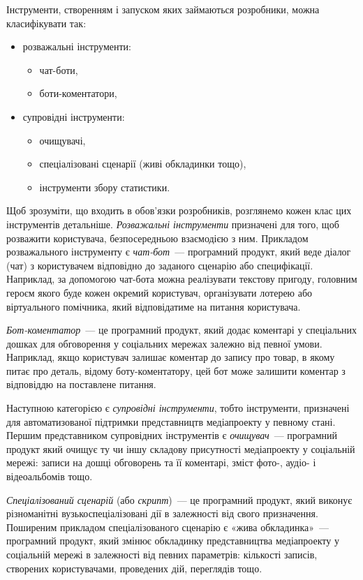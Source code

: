 \documentclass[
	a4paper,
	oneside,
	BCOR = 10mm,
	DIV = 12,
	12pt,
	headings = normal,
]{scrartcl}
\begin{document}
		Інструменти, створенням і запуском яких займаються розробники, можна класифікувати так:
		\begin{itemize}
			\item розважальні інструменти:
				\begin{itemize}
					\item чат-боти,
					\item боти-коментатори,
				\end{itemize}
			\item супровідні інструменти:
				\begin{itemize}
					\item очищувачі,
					\item спеціалізовані сценарії (живі обкладинки тощо),
					\item інструменти збору статистики.
				\end{itemize}
		\end{itemize}
		Щоб зрозуміти, що входить в обов'язки розробників, розглянемо кожен клас цих інструментів детальніше. \emph{Розважальні інструменти} призначені для того, щоб розважити користувача, безпосередньою взаємодією з ним. Прикладом розважального інструменту є \emph{чат-бот}~— програмний продукт, який веде діалог (чат) з користувачем відповідно до заданого сценарію або специфікації. Наприклад, за допомогою чат-бота можна реалізувати текстову пригоду, головним героєм якого буде кожен окремий користувач, організувати лотерею або віртуального помічника, який відповідатиме на питання користувача.

		\emph{Бот-коментатор}~— це програмний продукт, який додає коментарі у спеціальних дошках для обговорення у соціальних мережах залежно від певної умови. Наприклад, якщо користувач залишає коментар до запису про товар, в якому питає про деталь, відому боту-коментатору, цей бот може залишити коментар з відповіддю на поставлене питання. 

		Наступною категорією є \emph{супровідні інструменти}, тобто інструменти, призначені для автоматизованої підтримки представництв медіапроекту у певному стані. Першим представником супровідних інструментів є \emph{очищувач}~— програмний продукт який очищує ту чи іншу складову присутності медіапроекту у соціальній мережі: записи на дошці обговорень та її коментарі, зміст фото-, аудіо- і відеоальбомів тощо.

		\emph{Спеціалізований сценарій} (або \emph{скрипт})~— це програмний продукт, який виконує різноманітні вузькоспеціалізовані дії в залежності від свого призначення. Поширеним прикладом спеціалізованого сценарію є «жива обкладинка»~— програмний продукт, який змінює обкладинку представництва медіапроекту у соціальній мережі в залежності від певних параметрів: кількості записів, створених користувачами, проведених дій, переглядів тощо.
\end{document}
